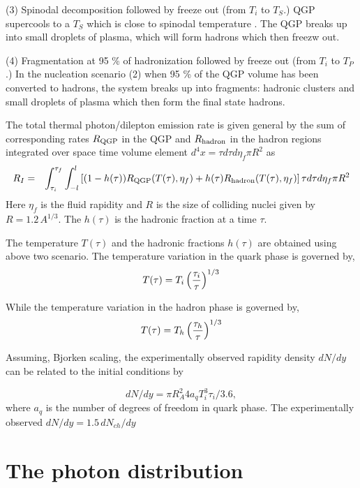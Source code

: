 (3) Spinodal decomposition followed by freeze out
             (from $T_i$ to $T_S$.)
   QGP supercools to a $T_S$ which is close to spinodal temperature
 \cite{SPINO}. The QGP breaks up into small droplets of plasma,
which will form hadrons which then freezw out.


(4) Fragmentation at 95 \% of hadronization followed by freeze out
               (from $T_i$ to $T_P$.)
  In the nucleation scenario (2) when 95 \% of the QGP volume has been 
converted to hadrons, the system breaks up into fragments: hadronic clusters 
and small droplets of plasma which then form the final state hadrons. 


  The total thermal photon/dilepton emission rate is given general by 
the sum of corresponding rates $R_{\rm QGP}$ in the QGP and $R_{\rm hadron}$ 
in the hadron regions integrated over space time volume 
element $d^4x = \tau d\tau d\eta_f \pi R^2$ as
\begin{eqnarray}\label{}
R_I  &=& \int_{\tau_i}^{\tau_f} \int_{-l}^{l} 
      \left[(1-h(\tau)) R_{\rm QGP}(T(\tau),\eta_f) 
   + h(\tau)  R_{\rm hadron}(T(\tau),\eta_f) \right]\tau d\tau d\eta_f \pi R^2
\end{eqnarray}
Here $\eta_f$ is the fluid rapidity and $R$ is the size of colliding 
nuclei given by $R=1.2\, A^{1/3}$. The $h(\tau)$ is the hadronic fraction
at a time $\tau$.

 The temperature $T(\tau)$ and the hadronic fractions $h(\tau)$ are
obtained using above two scenario. The temperature variation
in the quark phase is governed by,
\begin{eqnarray}\label{}
T(\tau) = T_i \left({\tau_i \over \tau}\right)^{1/3}
\end{eqnarray}


While the temperature variation in the hadron phase is governed by,
\begin{eqnarray}\label{}
T(\tau) = T_h \left({\tau_h \over \tau}\right)^{1/3}
\end{eqnarray}

 Assuming, Bjorken scaling, the experimentally observed rapidity 
density $dN/dy$ can be related to the initial conditions by

\begin{equation}
dN/dy = \pi R_A^2 4 a_q T_i^3 \tau_i/3.6,
\end{equation}
where $a_q$ is the number of degrees of freedom in quark phase.
The experimentally observed $dN/dy=1.5\, dN_{ch}/dy$ 


\section{The photon distribution}

